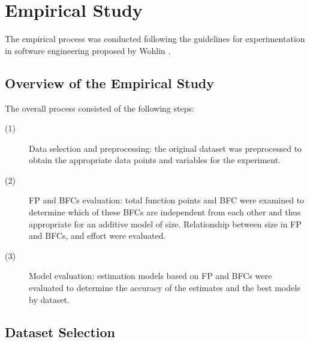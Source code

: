 \documentclass[conference]{IEEEtran}
\begin{document}
\section{Empirical Study} \label{sec:EmpiricalStudy}

The empirical process was conducted following the guidelines for experimentation in software engineering proposed by Wohlin \cite{Wohlin:2012}.

\subsection{Overview of the Empirical Study}
The overall process consisted of the following steps:

\begin{description}
  \item[(1)] Data selection and preprocessing: the original dataset was preprocessed to obtain the appropriate data points and variables for the experiment.
  \item[(2)] FP and BFCs evaluation: total function points and BFC were examined to determine which of these BFCs are independent from each other and thus appropriate for an additive model of size. Relationship between size in FP and BFCs, and effort were evaluated.
  \item[(3)] Model evaluation: estimation models based on FP and BFCs were evaluated to determine the accuracy of the estimates and the best models by dataset.
\end{description}

\subsection{Dataset Selection}
\end{document}

